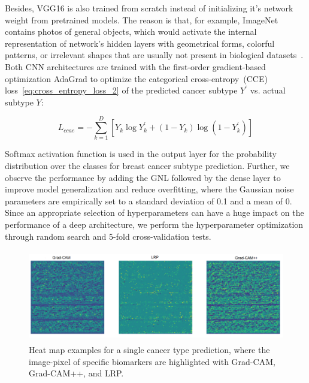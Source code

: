 \hspace*{3.5mm} Besides, VGG16 is also trained from scratch instead of initializing it's network weight from pretrained models. The reason is that, for example, ImageNet contains photos of general objects, which would activate the internal representation of network's hidden layers with geometrical forms, colorful patterns, or irrelevant shapes that are usually not present in biological datasets~\cite{Karim2020DeepCOVIDExplainer}. Both CNN architectures are trained with the first-order gradient-based optimization AdaGrad to optimize the categorical cross-entropy~(CCE) loss~\cref{eq:cross_entropy_loss_2} of the predicted cancer subtype $Y^{\prime}$ vs. actual subtype $Y$: 

\vspace{-2mm}
\begin{equation} 
    L_{ccae}=-\sum_{k=1}^{D}\left[Y_{k} \log Y_{k}^{\prime}+\left(1-Y_{k}\right) \log \left(1-Y_{k}^{\prime}\right)\right]
    \label{eq:cross_entropy_loss_2}
\end{equation} 

\hspace*{3.5mm} Softmax activation function is used in the output layer for the probability distribution over the classes for breast cancer subtype prediction. Further, we observe the performance by adding the GNL followed by the dense layer to improve model generalization and reduce overfitting, where the Gaussian noise parameters are empirically set to a standard deviation of 0.1 and a mean of 0. Since an appropriate selection of hyperparameters can have a huge impact on the performance of a deep architecture, we perform the hyperparameter optimization through random search and 5-fold cross-validation tests. 

\begin{figure}[h]
		\centering
		\includegraphics[width=\linewidth,height=40mm]{images/3_mode.png}
	\caption{Heat map examples for a single cancer type prediction, where the image-pixel of specific biomarkers are highlighted with Grad-CAM, Grad-CAM++, and LRP.} 
	\label{fig:3hms}
\end{figure}

